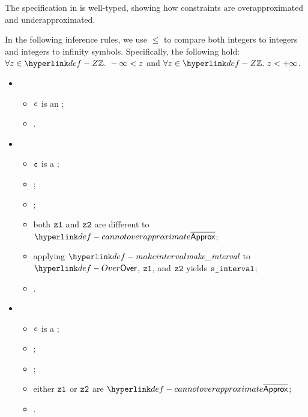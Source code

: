 The specification in  is well-typed,
showing how constraints are overapproximated and underapproximated.

In the following inference rules, we use $\leq$ to compare both integers to integers
and integers to infinity symbols. Specifically, the following hold:
$\forall z\in\Z.\ -\infty < z$ and $\forall z\in\Z.\ z < +\infty$.

\ProseParagraph
\OneApplies
\begin{itemize}
  \item {}
  \begin{itemize}
    \item $\texttt{c}$ is an \Proseexactconstraint{\ve};
    \item \Proseapproxexpr{$\tenv$}{$\vapprox$}{$\ve$}{$\vs$}\ProseTerminateAs{\CannotOverapproximate}.
  \end{itemize}

  \item {}
  \begin{itemize}
    \item $\texttt{c}$ is a \Proserangeconstraint{\veone}{\vetwo};
    \item \Proseapproxexprmin{$\tenv$}{$\veone$}{$\vzone$};
    \item \Proseapproxexprmax{$\tenv$}{$\vetwo$}{$\vztwo$};
    \item both $\vzone$ and $\vztwo$ are different to $\CannotOverapproximate$;
    \item applying $\makeinterval$ to $\Over$, $\vzone$, and $\vztwo$ yields $\texttt{s\_interval}$;
    \item {}.
  \end{itemize}

    \item {}
  \begin{itemize}
    \item $\texttt{c}$ is a \Proserangeconstraint{\veone}{\vetwo};
    \item \Proseapproxexprmin{$\tenv$}{$\veone$}{$\vzone$};
    \item \Proseapproxexprmax{$\tenv$}{$\vetwo$}{$\vztwo$};
    \item either $\vzone$ or $\vztwo$ are $\CannotOverapproximate$;
    \item {}.
  \end{itemize}


\end{itemize}
